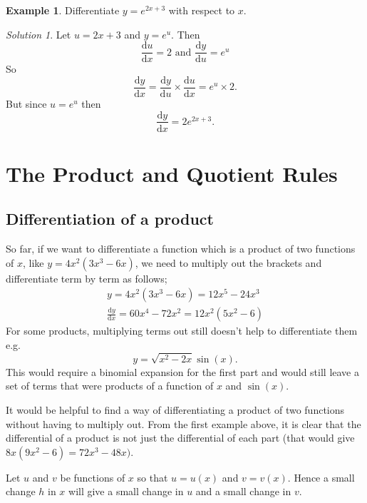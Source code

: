\documentclass[
  11pt,
  oneside]{book}
\newcommand{\slide}{}
\theoremstyle{definition}
\theoremstyle{definition}
\newtheorem{example}{Example}[chapter]
\theoremstyle{definition}
\theoremstyle{definition}
\theoremstyle{remark}
\newtheorem*{solution}{Solution}
\begin{document}
\slide

\begin{example}
Differentiate \(y=e^{2x+3}\) with respect to \(x\).
\end{example}

\begin{solution}
Let \(u = 2x+3\) and \(y = e^u\). Then
\[
\frac{\mathrm{d} u}{\mathrm{d} x} = 2\text{ and }\frac{\mathrm{d} y}{\mathrm{d} u} = e^u
\]
So
\[
\frac{\mathrm{d} y}{\mathrm{d} x} = \frac{\mathrm{d} y}{\mathrm{d} u}\times\frac{\mathrm{d} u}{\mathrm{d} x} = e^u\times2.
\]
But since \(u = e^u\) then
\[
\frac{\mathrm{d} y}{\mathrm{d} x} = 2e^{2x+3}.
\]
\end{solution}

\slide

\section{The Product and Quotient Rules}\label{lecture-six}

\subsection{Differentiation of a product}\label{differentiation-of-a-product}

So far, if we want to differentiate a function which is a product of two functions of \(x\), like \(y = 4x^2(3x^3 - 6x)\), we need to multiply out the brackets and differentiate term by term as follows;
\begin{gather*}
y = 4x^2(3x^3 - 6x) = 12x^5 - 24x^3\\
\frac{\mathrm{d} y}{\mathrm{d} x} = 60x^4 - 72x^2 = 12x^2(5x^2 - 6)
\end{gather*}
For some products, multiplying terms out still doesn't help to differentiate them e.g.
\[
y = \sqrt{x^2 - 2x} \sin(x).
\]
This would require a binomial expansion for the first part and would still leave a set of terms that were products of a function of \(x\) and \(\sin(x)\).
\slide

It would be helpful to find a way of differentiating a product of two functions without having to multiply out. From the first example above, it is clear that the differential of a product is not just the differential of each part (that would give \(8x(9x^2 - 6) = 72x^3 - 48x)\).

Let \(u\) and \(v\) be functions of \(x\) so that \(u = u(x)\) and \(v = v(x)\). Hence a small change \(h\) in \(x\) will give a small change in \(u\) and a small change in \(v\).
\end{document}
